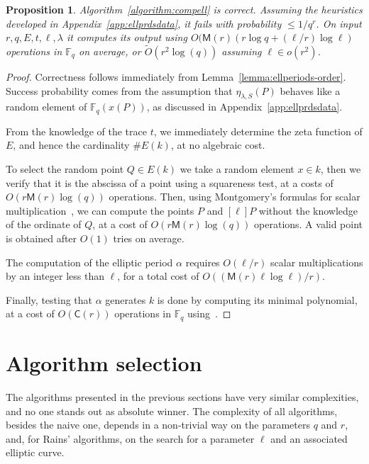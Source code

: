 \documentclass[12pt]{article}
\theoremstyle{plain}
\newtheorem{proposition}[theorem]{Proposition}
\theoremstyle{definition}
\newcommand{\tildO}{\tilde{O}}
\def\F{\ensuremath{\mathbb{F}}}
\def\MM{\ensuremath{\mathsf{M}}}
\def\CC{\ensuremath{\mathsf{C}}}
\newcounter{algorithm}
\begin{document}
\begin{proposition}
  Algorithm~\ref{algorithm:compell} is correct. Assuming the
  heuristics developed in Appendix~\ref{app:ellprdsdata}, it fails
  with probability $\le 1/q^r$.  On input
  $r,q,E,t,\ell,\lambda$ it computes its output using
  $O(\MM(r)(r\log{q} + (\ell/r)\log{\ell})$ operations in $\F_q$ on average, or
  $\tildO(r^2\log(q))$ assuming $\ell\in o(r^2)$.
\end{proposition}
\begin{proof}
  Correctness follows immediately from
  Lemma~\ref{lemma:ellperiods-order}. Success probability comes from
  the assumption that $\eta_{\lambda,S}(P)$ behaves like a random element of
  $\F_q(x(P))$, as discussed in Appendix~\ref{app:ellprdsdata}.

  From the knowledge of the trace $t$, we immediately determine the
  zeta function of $E$, and hence the cardinality $\# E(k)$, at
  no algebraic cost.

  To select the random point $Q\in E(k)$ we take a random
  element $x\in k$, then we verify that it is the abscissa of a
  point using a squareness test, at a costs of $O(r\MM(r)\log(q))$
  operations. Then, using Montgomery's formulas for scalar
  multiplication~\cite{montgomery}, we can compute the points $P$ and
  $[\ell]P$ without the knowledge of the ordinate of $Q$, at a cost of
  $O(r\MM(r)\log(q))$ operations. A valid point is obtained after
  $O(1)$ tries on average.

  The computation of the elliptic period $\alpha$ requires $O(\ell/r)$ scalar
  multiplications by an integer less than $\ell$, for a total cost of
  $O((\MM(r)\ell\log\ell)/r)$.

  Finally, testing that $\alpha$ generates $k$ is done by computing
  its minimal polynomial, at a cost of $O(\CC(r))$ operations in
  $\F_q$ using~\cite{shoup93}.
\end{proof}


\section{Algorithm selection}
\label{sec:selection}

The algorithms presented in the previous sections have very similar
complexities, and no one stands out as absolute winner. The complexity
of all algorithms, besides the naive one, depends in a non-trivial way
on the parameters $q$ and $r$, and, for Rains' algorithms, on the
search for a parameter $\ell$ and an associated elliptic curve.
\end{document}
